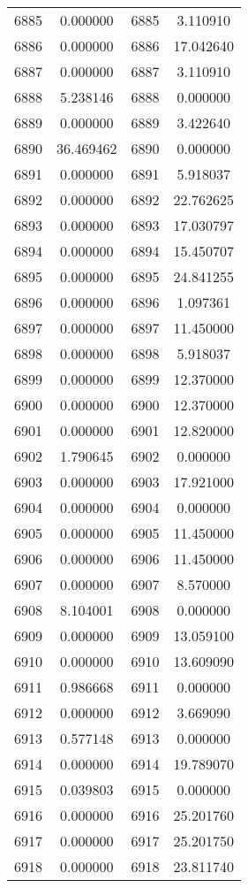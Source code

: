 \documentclass[12pt]{article}
\begin{document}
\begin{longtable}{@{}cccc@{}}
6885 & 0.000000 & 6885 & 3.110910 \\
6886 & 0.000000 & 6886 & 17.042640 \\
6887 & 0.000000 & 6887 & 3.110910 \\
6888 & 5.238146 & 6888 & 0.000000 \\
6889 & 0.000000 & 6889 & 3.422640 \\
6890 & 36.469462 & 6890 & 0.000000 \\
6891 & 0.000000 & 6891 & 5.918037 \\
6892 & 0.000000 & 6892 & 22.762625 \\
6893 & 0.000000 & 6893 & 17.030797 \\
6894 & 0.000000 & 6894 & 15.450707 \\
6895 & 0.000000 & 6895 & 24.841255 \\
6896 & 0.000000 & 6896 & 1.097361 \\
6897 & 0.000000 & 6897 & 11.450000 \\
6898 & 0.000000 & 6898 & 5.918037 \\
6899 & 0.000000 & 6899 & 12.370000 \\
6900 & 0.000000 & 6900 & 12.370000 \\
6901 & 0.000000 & 6901 & 12.820000 \\
6902 & 1.790645 & 6902 & 0.000000 \\
6903 & 0.000000 & 6903 & 17.921000 \\
6904 & 0.000000 & 6904 & 0.000000 \\
6905 & 0.000000 & 6905 & 11.450000 \\
6906 & 0.000000 & 6906 & 11.450000 \\
6907 & 0.000000 & 6907 & 8.570000 \\
6908 & 8.104001 & 6908 & 0.000000 \\
6909 & 0.000000 & 6909 & 13.059100 \\
6910 & 0.000000 & 6910 & 13.609090 \\
6911 & 0.986668 & 6911 & 0.000000 \\
6912 & 0.000000 & 6912 & 3.669090 \\
6913 & 0.577148 & 6913 & 0.000000 \\
6914 & 0.000000 & 6914 & 19.789070 \\
6915 & 0.039803 & 6915 & 0.000000 \\
6916 & 0.000000 & 6916 & 25.201760 \\
6917 & 0.000000 & 6917 & 25.201750 \\
6918 & 0.000000 & 6918 & 23.811740 \\

\end{longtable}
\end{document}
